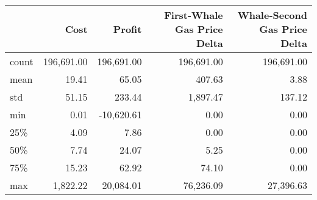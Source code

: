 \begin{tabular}{lrrrr}
\toprule
{} &       Cost &     Profit & First-Whale Gas Price Delta & Whale-Second Gas Price Delta \\
\midrule
count & 196,691.00 & 196,691.00 &                  196,691.00 &                   196,691.00 \\
mean  &      19.41 &      65.05 &                      407.63 &                         3.88 \\
std   &      51.15 &     233.44 &                    1,897.47 &                       137.12 \\
min   &       0.01 & -10,620.61 &                        0.00 &                         0.00 \\
25\%   &       4.09 &       7.86 &                        0.00 &                         0.00 \\
50\%   &       7.74 &      24.07 &                        5.25 &                         0.00 \\
75\%   &      15.23 &      62.92 &                       74.10 &                         0.00 \\
max   &   1,822.22 &  20,084.01 &                   76,236.09 &                    27,396.63 \\
\bottomrule
\end{tabular}
